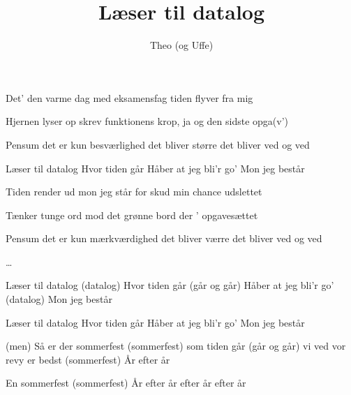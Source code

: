\documentclass[danish]{article}
\title{Læser til datalog}
\author{Theo (og Uffe)}
\begin{document}
\twocolumn[ %
\maketitle


]
\begin{song}

 Det' den varme dag
med eksamensfag
tiden flyver fra mig

Hjernen lyser op
skrev funktionens krop, ja
og den sidste opga(v')

Pensum det er kun besværlighed
det bliver større
det bliver ved og ved

 Læser til datalog
  Hvor tiden går
  Håber at jeg bli'r go'
  Mon jeg består

 Tiden render ud
mon jeg står for skud
min chance udslettet

Tænker tunge ord
mod det grønne bord
der ' opgavesættet

Pensum det er kun mærkværdighed
det bliver værre
det bliver ved og ved

 \ldots

 Læser til datalog (datalog)
  Hvor tiden går (går og går)
  Håber at jeg bli'r go' (datalog)
  Mon jeg består

 
  Læser til datalog
  Hvor tiden går
  Håber at jeg bli'r go'
  Mon jeg består

 
  (men) Så er der sommerfest (sommerfest)
  som tiden går (går og går) 
  vi ved vor revy er bedst (sommerfest)
  År efter år

 En sommerfest (sommerfest)
  År efter år efter år efter år 

\end{song}
\end{document}
